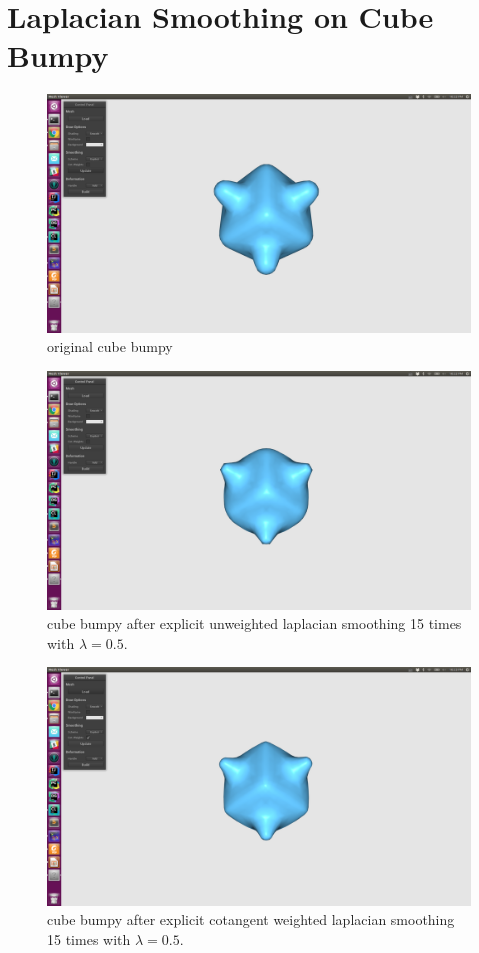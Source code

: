 \documentclass[twocolumn, a4paper]{article}
\begin{document}
\section{Laplacian Smoothing on Cube Bumpy}
\begin{figure}[H]
	\centering
	\includegraphics[width=1.0\linewidth]{cube_bumpy.png}
	\caption{original cube bumpy}
\end{figure}
\begin{figure}[H]
	\centering
	\includegraphics[width=1.0\linewidth]{cube_bumpy_en_15.png}
	\caption{cube bumpy after explicit unweighted laplacian smoothing 15 times with $\lambda=0.5$.}
\end{figure}
\begin{figure}[H]
	\centering
	\includegraphics[width=1.0\linewidth]{cube_bumpy_ec_15.png}
	\caption{cube bumpy after explicit cotangent weighted laplacian smoothing 15 times with $\lambda=0.5$.}
\end{figure}
\end{document}
